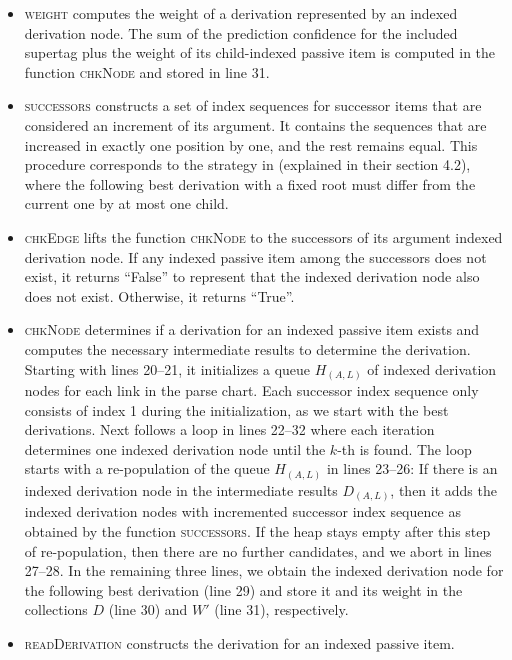 \documentclass[../../document.tex]{subfiles}
\begin{document}
    \begin{itemize}
        \item \textsc{weight} computes the weight of a derivation represented by an indexed derivation node.
            The sum of the prediction confidence for the included supertag plus the weight of its child-indexed passive item is computed in the function \textsc{chkNode} and stored in line 31.
        \item \textsc{successors} constructs a set of index sequences for successor items that are considered an increment of its argument.
            It contains the sequences that are increased in exactly one position by one, and the rest remains equal.
            This procedure corresponds to the strategy in  (explained in their section 4.2), where the following best derivation with a fixed root must differ from the current one by at most one child.
        \item \textsc{chkEdge} lifts the function \textsc{chkNode} to the successors of its argument indexed derivation node.
            If any indexed passive item among the successors does not exist, it returns ``False'' to represent that the indexed derivation node also does not exist. Otherwise, it returns ``True''.
        \item \textsc{chkNode} determines if a derivation for an indexed passive item exists and computes the necessary intermediate results to determine the derivation.
            Starting with lines 20--21, it initializes a queue \(H_{(A, L)}\) of indexed derivation nodes for each link in the parse chart.
            Each successor index sequence only consists of index 1 during the initialization, as we start with the best derivations.
            Next follows a loop in lines 22--32 where each iteration determines one indexed derivation node until the \(k\)-th is found.
            The loop starts with a re-population of the queue \(H_{(A, L)}\) in lines 23--26:
                If there is an indexed derivation node in the intermediate results \(D_{(A, L)}\), then it adds the indexed derivation nodes with incremented successor index sequence as obtained by the function \textsc{successors}.
            If the heap stays empty after this step of re-population, then there are no further candidates, and we abort in lines 27--28.
            In the remaining three lines, we obtain the indexed derivation node for the following best derivation (line 29) and store it and its weight in the collections $D$ (line 30) and $W'$ (line 31), respectively.
        \item \textsc{readDerivation} constructs the derivation for an indexed passive item.

\end{itemize}
\end{document}
